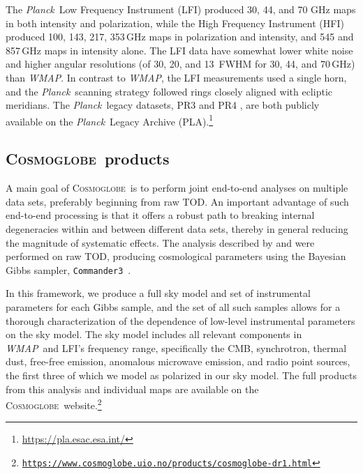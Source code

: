 \documentclass[twocolumn]{../../common/aa}
\def\WMAP{\emph{WMAP}}
\def\Planck{\emph{Planck}}
\def\commanderthree{\texttt{Commander3}}
\newcommand{\cosmoglobe}{\textsc{Cosmoglobe}}
\newcommand{\Cosmoglobe}{\textsc{Cosmoglobe}}
\begin{document}
The \Planck\ Low Frequency Instrument (LFI) produced  30, 44, and 70 GHz maps in both intensity and polarization, while the High Frequency Instrument (HFI) produced 100, 143, 217, 353\,GHz maps in polarization and intensity, and 545 and 857\,GHz maps in intensity alone. The LFI data have somewhat lower white noise and higher angular resolutions (of 30\arcm, 20\arcm, and 13\arcm\ FWHM for 30, 44, and 70\,GHz) than \WMAP. In contrast to \WMAP, the LFI measurements used a single horn, and the \Planck\ scanning strategy followed rings closely aligned with ecliptic meridians. The \Planck\ legacy datasets, PR3 \citep{planck2016-l01} and PR4 \citep{planck2020-LVII}, are both publicly available on the \Planck\ Legacy Archive (PLA).\footnote{\url{https://pla.esac.esa.int/}}

\subsection{\Cosmoglobe\ products}
\label{sec:cosmoglobe_data}


A main goal of \Cosmoglobe\ is to perform joint end-to-end analyses on multiple data sets, preferably beginning from raw TOD. An important advantage of such end-to-end processing is that it offers a robust path to breaking internal degeneracies within and between different data sets, thereby in general reducing the magnitude of systematic effects. The analysis described by \citet{bp01} and \citet{watts2023_dr1} were performed on raw TOD, producing cosmological parameters using the Bayesian Gibbs sampler, \commanderthree\ \citep{bp03}. %

In this framework, we produce a full sky model and set of instrumental parameters for each Gibbs sample, and the set of all such samples allows for a thorough characterization of the dependence of low-level instrumental parameters on the sky model. The sky model includes all relevant components in \WMAP\ and LFI's frequency range, specifically the CMB, synchrotron, thermal dust, free-free emission, anomalous microwave emission, and radio point sources, the first three of which we model as polarized in our sky model. The full products from this analysis and individual maps are available on the \cosmoglobe\ website.\footnote{\href{https://www.cosmoglobe.uio.no/products/cosmoglobe-dr1.html}{\texttt{https://www.cosmoglobe.uio.no/products/\newline cosmoglobe-dr1.html}}}
\end{document}
